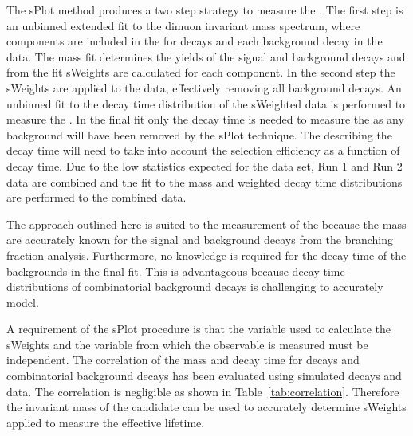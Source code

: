 The sPlot method produces a two step strategy to measure the \el. The first step is an unbinned extended \ml fit to the dimuon invariant mass spectrum, where components are included in the \pdf for \bsmumu decays and each background decay in the data. The mass fit determines the yields of the signal and background decays and from the fit sWeights are calculated for each component. In the second step the sWeights are applied to the data, effectively removing all background decays. An unbinned \ml fit to the decay time distribution of the sWeighted data is performed to measure the \bsmumu \el. In the final fit only the \bsmumu decay time \pdf is needed to measure the \el as any background will have been removed by the sPlot technique. The \pdf describing the decay time will need to take into account the selection efficiency as a function of decay time. Due to the low statistics expected for the data set, Run 1 and Run 2 data are combined and the fit to the mass and weighted decay time distributions are performed to the combined data.


The approach outlined here is suited to the measurement of the \bsmumu \el because the mass \pdfs are accurately known for the signal and background decays from the branching fraction analysis. Furthermore, no knowledge is required for the decay time \pdfs of the backgrounds in the final fit. This is advantageous because decay time distributions of combinatorial background decays is challenging to accurately model.


A requirement of the sPlot procedure is that the variable used to calculate the sWeights and the variable from which the observable is measured must be independent. The correlation of the mass and decay time for \bsmumu decays and combinatorial background decays has been evaluated using simulated decays and data. The correlation is negligible %
as shown in Table~\ref{tab:correlation}. Therefore the invariant mass of the \bsmumu candidate can be used to accurately determine sWeights applied  to measure the \bsmumu effective lifetime.

